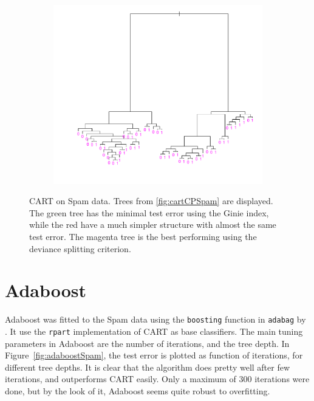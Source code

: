 \begin{figure}[htb]
\begin{subfigure}[b]{0.48\textwidth}
  \end{subfigure}
  \quad
  \begin{subfigure}[b]{0.48\textwidth}
    \includegraphics[width=\textwidth]{./figures/cartOptDevianceSpam.pdf}
  \end{subfigure}
  \vspace{1\baselineskip}
  \caption{CART on Spam data. Trees from \ref{fig:cartCPSpam} are displayed. The green tree has the minimal test error using the Ginie index, while the red have a much simpler structure with almost the same test error. The magenta tree is the best performing using the deviance splitting criterion.}
  \label{fig:CartSpam}
\end{figure}


\section{Adaboost}
\label{sec:SimAdaBoost}
Adaboost was fitted to the Spam data using the \verb+boosting+ function in \verb+adabag+ by \cite{adabag}. It use the \verb+rpart+ implementation of CART as base classifiers. The main tuning parameters in Adaboost are the number of iterations, and the tree depth. In Figure~\ref{fig:adaboostSpam}, the test error is plotted as function of iterations, for different tree depths. It is clear that the algorithm does pretty well after few iterations, and outperforms CART easily. Only a maximum of 300 iterations were done, but by the look of it, Adaboost seems quite robust to overfitting. 

